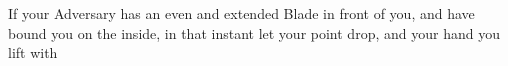 

If your Adversary has an even and extended Blade in front of you, and have bound you on the inside, in that instant let your point drop, and your hand you lift with
